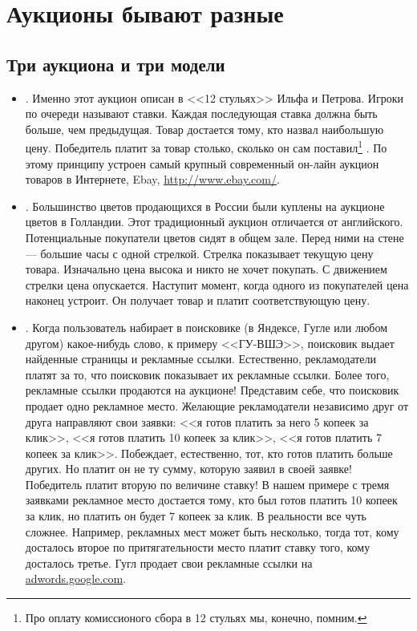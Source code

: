 \chapter{Аукционы бывают разные}




\section{Три аукциона и три модели}

\begin{itemize}

\item {}. Именно этот аукцион описан в <<12 стульях>> Ильфа и Петрова. Игроки по очереди называют ставки. Каждая последующая ставка должна быть больше, чем предыдущая. Товар достается тому, кто назвал наибольшую цену. Победитель платит за товар столько, сколько он сам поставил\footnote{Про оплату комиссионого сбора в 12 стульях мы, конечно, помним.} . По этому принципу устроен самый крупный современный он-лайн аукцион товаров в Интернете, Ebay, \url{http://www.ebay.com/}.

\item {}. Большинство цветов продающихся в России были куплены на аукционе цветов в Голландии. Этот традиционный аукцион отличается от английского. Потенциальные покупатели цветов сидят в общем зале. Перед ними на стене --- большие часы с одной стрелкой. Стрелка показывает текущую цену товара. Изначально цена высока и никто не хочет покупать. С движением стрелки цена опускается. Наступит момент, когда одного из покупателей цена наконец устроит. Он получает товар и платит соответствующую цену.

\item {}. Когда пользователь набирает в поисковике (в Яндексе, Гугле или любом другом) какое-нибудь слово, к примеру <<ГУ-ВШЭ>>, поисковик выдает найденные страницы и рекламные ссылки. Естественно, рекламодатели платят за то, что поисковик показывает их рекламные ссылки. Более того, рекламные ссылки продаются на аукционе! Представим себе, что поисковик продает одно рекламное место. Желающие рекламодатели независимо друг от друга направляют свои заявки: <<я готов платить за него 5 копеек за клик>>, <<я готов платить 10 копеек за клик>>, <<я готов платить 7 копеек за клик>>. Побеждает, естественно, тот, кто готов платить больше других. Но платит он не ту сумму, которую заявил в своей заявке! Победитель платит вторую по величине ставку! В нашем примере с тремя заявками рекламное место достается тому, кто был готов платить 10 копеек за клик, но платить он будет 7 копеек за клик. В реальности все чуть сложнее. Например, рекламных мест может быть несколько, тогда тот, кому досталось второе по притягательности место платит ставку того, кому досталось третье. Гугл продает свои рекламные ссылки на \url{adwords.google.com}.


\end{itemize}
